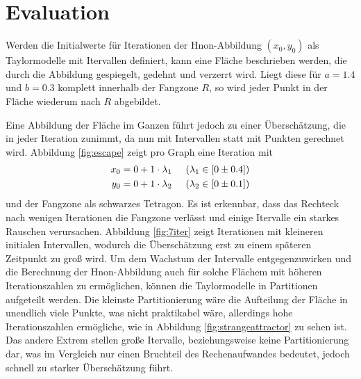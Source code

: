 
\chapter{Evaluation}
\label{ch:Evaluierung}

Werden die Initialwerte für Iterationen der H\e non-Abbildung $(x_0, y_0)$ als Taylormodelle mit Itervallen definiert, kann eine Fläche beschrieben werden, die durch die Abbildung gespiegelt, gedehnt und verzerrt wird. Liegt diese für $a=1.4$ und $b=0.3$ komplett innerhalb der Fangzone $R$, so wird jeder Punkt in der Fläche wiederum nach $R$ abgebildet. 


Eine Abbildung der Fläche im Ganzen führt jedoch zu einer Überschätzung, die in jeder Iteration zunimmt, da nun mit Intervallen statt mit Punkten gerechnet wird. Abbildung \ref{fig:escape} zeigt pro Graph eine Iteration mit 
\begin{align*}
x_0 = 0 + 1 \cdot \lambda_1 & \hspace{0.5cm} (\lambda_1 \in [0 \pm 0.4]) \\
 y_0 = 0 + 1 \cdot \lambda_2 & \hspace{0.5cm} (\lambda_2 \in [0 \pm 0.1])
\end{align*}
und der Fangzone als schwarzes Tetragon. Es ist erkennbar, dass das Rechteck nach wenigen Iterationen die Fangzone verlässt und einige Itervalle ein starkes Rauschen verursachen. Abbildung \ref{fig:7iter} zeigt  Iterationen mit kleineren initialen Intervallen, wodurch die Überschätzung erst zu einem späteren Zeitpunkt zu groß wird. Um dem Wachstum der Intervalle entgegenzuwirken und die Berechnung der H\e non-Abbildung auch für solche Flächem mit höheren Iterationszahlen zu ermöglichen, können die Taylormodelle in Partitionen aufgeteilt werden.  Die kleinste Partitionierung wäre die Aufteilung der Fläche in unendlich viele Punkte, was nicht praktikabel wäre, allerdings hohe Iterationszahlen ermögliche, wie in Abbildung \ref{fig:strangeattractor} zu sehen ist. Das andere Extrem stellen große Itervalle, beziehungsweise keine Partitionierung dar, was im Vergleich nur einen Bruchteil des Rechenaufwandes bedeutet, jedoch schnell zu starker Überschätzung führt.

